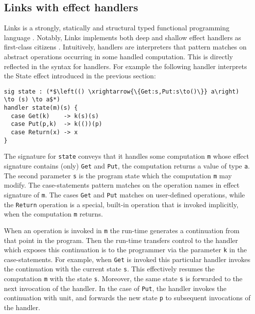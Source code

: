 \documentclass[preprint,10pt,numbers]{sigplanconf}
\begin{document}


  \subsection{Links with effect handlers}\label{sec:effect-links}
  Links is a strongly, statically and structural typed functional programming language \cite{Cooper2006}. Notably, Links implements both deep and shallow effect handlers as first-class citizens \cite{Hillerstrom2015}. Intuitively, handlers are interpreters that pattern matches on abstract operations occurring in some handled computation. This is directly reflected in the syntax for handlers. For example the following handler interprets the State effect introduced in the previous section:
\begin{lstlisting}[style=links,caption={}]
sig state : (*$\left(() \xrightarrow{\{Get:s,Put:s\to()\}} a\right) \to (s) \to a$*)
handler state(m)(s) {
  case Get(k)    -> k(s)(s)
  case Put(p,k)  -> k(())(p)
  case Return(x) -> x
}
\end{lstlisting}
The signature for \texttt{state} conveys that it handles some computation \texttt{m} whose effect signature contains (only) \texttt{Get} and \texttt{Put}, the computation returns a value of type \texttt{a}. The second parameter \texttt{s} is the program state which the computation \texttt{m} may modify.
The case-statements pattern matches on the operation names in effect signature of \texttt{m}.
The cases \texttt{Get} and \texttt{Put} matches on user-defined operations, while the \texttt{Return} operation is a special, built-in operation that is invoked implicitly, when the computation \texttt{m} returns.

When an operation is invoked in \texttt{m} the run-time generates a continuation from that point in the program. Then the run-time transfers control to the handler which exposes this continuation is to the programmer via the parameter \texttt{k} in the case-statements. For example, when \texttt{Get} is invoked this particular handler invokes the continuation with the current state \texttt{s}. This effectively resumes the computation \texttt{m} with the state \texttt{s}. Moreover, the same state \texttt{s} is forwarded to the next invocation of the handler. In the case of \texttt{Put}, the handler invokes the continuation with unit, and forwards the new state \texttt{p} to subsequent invocations of the handler.
\end{document}
